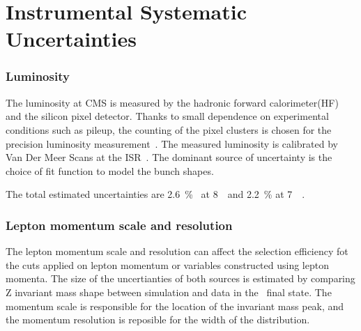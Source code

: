 \section{Instrumental Systematic Uncertainties} 


\subsubsection{Luminosity}

The luminosity at CMS is measured by the hadronic forward calorimeter(HF)
and the silicon pixel detector. Thanks to small dependence on experimental 
conditions such as pileup, the counting of the pixel clusters is chosen 
for the precision luminosity measurement~\cite{CMS-PAS-LUM-13-001}. 
The measured luminosity is calibrated by Van Der Meer Scans at the 
ISR~\cite{CMS-PAS-LUM-13-001}.
The dominant source of uncertainty is the choice of fit function 
to model the bunch shapes.  

The total estimated uncertainties are 2.6~\%~\cite{CMS-PAS-LUM-13-001} at 8~\TeV\ 
and 2.2~\% at 7~\TeV~\cite{Chatrchyan:2013oda}.  

\subsubsection{Lepton momentum scale and resolution}

The lepton momentum scale and resolution can affect the selection efficiency 
fot the cuts applied on lepton momentum or variables constructed using 
lepton momenta. The size of the uncertianties of both sources is estimated 
by comparing Z invariant mass shape between simulation and data in the \SF\ 
final state. The momentum scale is responsible for the location of the 
invariant mass peak, and the momentum resolution is reposible for the width 
of the distribution. 

